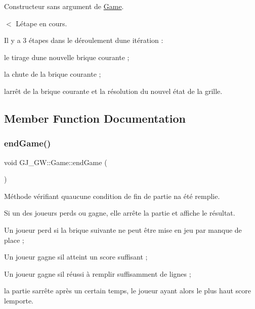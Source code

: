 Constructeur sans argument de \hyperlink{class_g_j___g_w_1_1_game}{Game}. 

$<$ L\textquotesingle{}étape en cours.

Il y a 3 étapes dans le déroulement d\textquotesingle{}une itération \+:
\begin{DoxyItemize}
\item le tirage d\textquotesingle{}une nouvelle brique courante ;
\item la chute de la brique courante ;
\item l\textquotesingle{}arrêt de la brique courante et la résolution du nouvel état de la grille. 
\end{DoxyItemize}

\subsection{Member Function Documentation}
\hypertarget{class_g_j___g_w_1_1_game_ad09c3f7d5281b6bbc1a7166cb8077af1}{}\label{class_g_j___g_w_1_1_game_ad09c3f7d5281b6bbc1a7166cb8077af1} 
\subsubsection{\texorpdfstring{end\+Game()}{endGame()}}
{\footnotesize\ttfamily void G\+J\+\_\+\+G\+W\+::\+Game\+::end\+Game (\begin{DoxyParamCaption}{ }\end{DoxyParamCaption})}



Méthode vérifiant qu\textquotesingle{}aucune condition de fin de partie n\textquotesingle{}a été remplie. 

Si un des joueurs perds ou gagne, elle arrête la partie et affiche le résultat.
\begin{DoxyItemize}
\item Un joueur perd si la brique suivante ne peut être mise en jeu par manque de place ;
\item Un joueur gagne s\textquotesingle{}il atteint un score suffisant ;
\item Un joueur gagne s\textquotesingle{}il réussi à remplir suffisamment de lignes ;
\item la partie s\textquotesingle{}arrête après un certain temps, le joueur ayant alors le plus haut score l\textquotesingle{}emporte. 
\end{DoxyItemize}\hypertarget{class_g_j___g_w_1_1_game_addf52c888f8deed2651bda020ecde811}{}\label{class_g_j___g_w_1_1_game_addf52c888f8deed2651bda020ecde811} 
